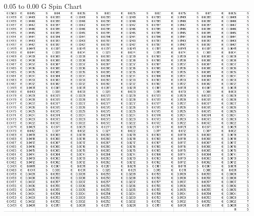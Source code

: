 \documentclass{article}
\begin{document}
\begin{center}
\LARGE 0.05 to 0.00 G Spin Chart
 \includegraphics[keepaspectratio,scale=0.7]{111_3000/005to000SpinChart.png}
\end{center}
\pagebreak
\end{document}
